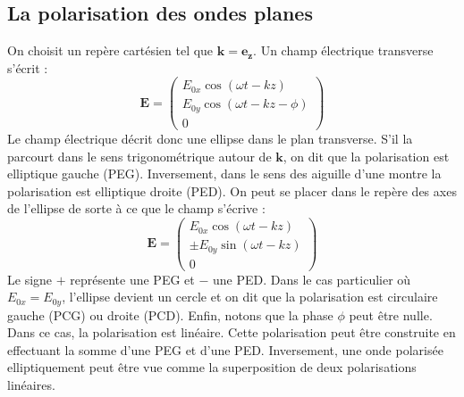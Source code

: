 \subsection{La polarisation des ondes planes}
\label{sec:circpolar}
On choisit un repère cartésien tel que $\bm{k}=\bm{e_z}$. Un champ électrique transverse s'écrit :
\begin{equation}
\bm{E}=\begin{pmatrix}
E_{0x}\cos{(\omega t-kz)}\\
E_{0y}\cos{(\omega t-kz-\phi)}\\
0
\end{pmatrix}
\end{equation}
Le champ électrique décrit donc une ellipse dans le plan transverse. S'il la parcourt dans le sens trigonométrique autour de $\bm{k}$, on dit que la polarisation est elliptique gauche (PEG). Inversement, dans le sens des aiguille d'une montre la polarisation est elliptique droite (PED). On peut se placer dans le repère des axes de l'ellipse de sorte à ce que le champ s'écrive :
\begin{equation}
\bm{E}=\begin{pmatrix}
E_{0x}\cos{(\omega t-kz)}\\
\pm E_{0y}\sin{(\omega t-kz)}\\
0
\end{pmatrix}
\end{equation}
Le signe $+$ représente une PEG et $-$ une PED. Dans le cas particulier où $E_{0x}=E_{0y}$, l'ellipse devient un cercle et on dit que la polarisation est circulaire gauche (PCG) ou droite (PCD). Enfin, notons que la phase $\phi$ peut être nulle. Dans ce cas, la polarisation est linéaire. Cette polarisation peut être construite en effectuant la somme d'une PEG et d'une PED. Inversement, une onde polarisée elliptiquement peut être vue comme la superposition de deux polarisations linéaires.

